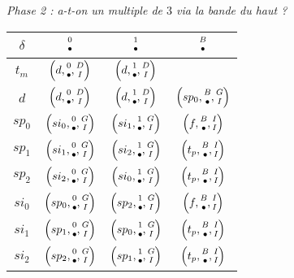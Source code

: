 \begin{center}
	\emph{\small Phase 2 : a-t-on un multiple de $3$ via la bande du haut ?}
	
	\smallskip
	\renewcommand{\arraystretch}{1.25}
	\begin{tabular}{|c||c|c|c|}
		\hline
		$\delta$ 
			& $\twocoord{0}{\bullet}$ 
			& $\twocoord{1}{\bullet}$ 
			& $\twocoord{B}{\bullet}$  \\
		\hline
		\hline
		$t_m$ 
			& $\left( d , \twocoord{0}{\bullet}, \twocoord{D}{I} \right)$ 
			& $\left( d , \twocoord{1}{\bullet}, \twocoord{D}{I} \right)$
			&  \\
		\hline
		$d$ 
			& $\left( d   , \twocoord{0}{\bullet}, \twocoord{D}{I} \right)$ 
			& $\left( d   , \twocoord{1}{\bullet}, \twocoord{D}{I} \right)$
			& $\left( sp_0, \twocoord{B}{\bullet}, \twocoord{G}{I} \right)$ \\
		\hline
		\hline
		$sp_0$ 
			& $\left( si_0 , \twocoord{0}{\bullet}, \twocoord{G}{I} \right)$ 
			& $\left( si_1 , \twocoord{1}{\bullet}, \twocoord{G}{I} \right)$
			& $\left( f    , \twocoord{B}{\bullet}, \twocoord{I}{I} \right)$ \\
		\hline
		$sp_1$ 
			& $\left( si_1 , \twocoord{0}{\bullet}, \twocoord{G}{I} \right)$ 
			& $\left( si_2 , \twocoord{1}{\bullet}, \twocoord{G}{I} \right)$
			& $\left( t_p  , \twocoord{B}{\bullet}, \twocoord{I}{I} \right)$ \\
		\hline
		$sp_2$ 
			& $\left( si_2 , \twocoord{0}{\bullet}, \twocoord{G}{I} \right)$ 
			& $\left( si_0 , \twocoord{1}{\bullet}, \twocoord{G}{I} \right)$
			& $\left( t_p  , \twocoord{B}{\bullet}, \twocoord{I}{I} \right)$ \\
		\hline
		\hline
		$si_0$ 
			& $\left( sp_0 , \twocoord{0}{\bullet}, \twocoord{G}{I} \right)$ 
			& $\left( sp_2 , \twocoord{1}{\bullet}, \twocoord{G}{I} \right)$
			& $\left( f    , \twocoord{B}{\bullet}, \twocoord{I}{I} \right)$ \\
		\hline
		$si_1$ 
			& $\left( sp_1 , \twocoord{0}{\bullet}, \twocoord{G}{I} \right)$ 
			& $\left( sp_0 , \twocoord{1}{\bullet}, \twocoord{G}{I} \right)$
			& $\left( t_p  , \twocoord{B}{\bullet}, \twocoord{I}{I} \right)$ \\
		\hline
		$si_2$ 
			& $\left( sp_2 , \twocoord{0}{\bullet}, \twocoord{G}{I} \right)$ 
			& $\left( sp_1 , \twocoord{1}{\bullet}, \twocoord{G}{I} \right)$
			& $\left( t_p  , \twocoord{B}{\bullet}, \twocoord{I}{I} \right)$ \\
		\hline
	\end{tabular}
	\renewcommand{\arraystretch}{1}
\end{center}





